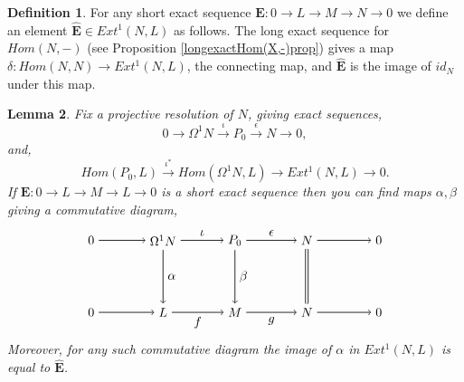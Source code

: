 \documentclass[11.5pt, twoside, a4paper, titlepage]{report}
\theoremstyle{definition}
\newtheorem{mydef}{Definition}[section]
\theoremstyle{plain}
\newtheorem{lem}[mydef]{Lemma}
\begin{document}
\begin{mydef}
For any short exact sequence $\mathbf{E}: 0 \xrightarrow{} L \xrightarrow{} M \xrightarrow{} N \xrightarrow{} 0$ we define an element $\mathbf{\hat{E}}\in Ext^1(N,L)$ as follows. The long exact sequence for $Hom(N,-)$ (see Proposition \ref{longexactHom(X,-)prop}) gives a map $\delta: Hom(N,N) \to Ext^1(N,L)$, the connecting map, and $\mathbf{\hat{E}}$ is the image of $id_N$ under this map.
\end{mydef}

\begin{lem} \label{alphabetalem}
Fix a projective resolution of $N$, giving exact sequences,
\begin{equation*}
0 \xrightarrow{} \Omega^1N \xrightarrow{\iota} P_0 \xrightarrow{\epsilon} N \xrightarrow{}0,
\end{equation*}
and,
\begin{equation*}
Hom(P_0,L) \xrightarrow{\iota^{\ast}} Hom(\Omega^1N,L) \xrightarrow{} Ext^1(N,L) \xrightarrow{}0.
\end{equation*}
If $\mathbf{E}: 0 \xrightarrow{}L \xrightarrow{} M \xrightarrow{}L\xrightarrow{}0$ is a short exact sequence then you can find maps $\alpha, \beta$ giving a commutative diagram,
\begin{equation*}
\begin{tikzpicture}[->,-latex, auto, main path/.style={->, semithick}, main node/.style={}]
\node	[main node]		(2) at (2,0)		{$0$};
\node	[main node]		(3) at (4,0)		{$\Omega^1N$};
\node [main node]		(4) at (6,0)		{$P_0$};
\node [main node]		(5) at (8,0)		{$N$};
\node	[main node]		(11) at (10,0)	{$0$};

\node	[main node]		(7) at (2,-2)		{$0$};
\node	[main node]		(8) at (4,-2)		{$L$};
\node [main node]		(9) at (6,-2)		{$M$};
\node [main node]		(10) at (8,-2)	{$N$};
\node [main node]		(13) at (10,-2)	{$0$};

\draw (2) edge [main path] node [auto] {$$} (3);
\draw (3) edge [main path] node [auto] {$\iota$} (4);
\draw (4) edge [main path] node [auto] {$\epsilon$} (5);
\draw (5) edge [main path] node [auto] {$$} (11);

\draw (7) edge [main path] node [auto] {$$} (8);
\path (8) edge [main path] node [auto, swap] {$f$} (9);
\draw (9) edge [main path] node [auto, swap] {$g$} (10);
\draw (10) edge [main path] node [auto, swap] {$$} (13);

\draw (3) edge [main path] node [auto] {$\alpha$} (8);
\draw (4) edge [main path] node [auto] {$\beta$} (9);
\draw (5) edge [-, double, semithick, double distance=1.5pt] (10);
\end{tikzpicture}
\end{equation*}
Moreover, for any such commutative diagram the image of $\alpha$ in $Ext^1(N,L)$ is equal to $\mathbf{\hat{E}}$.
\end{lem}
\end{document}

